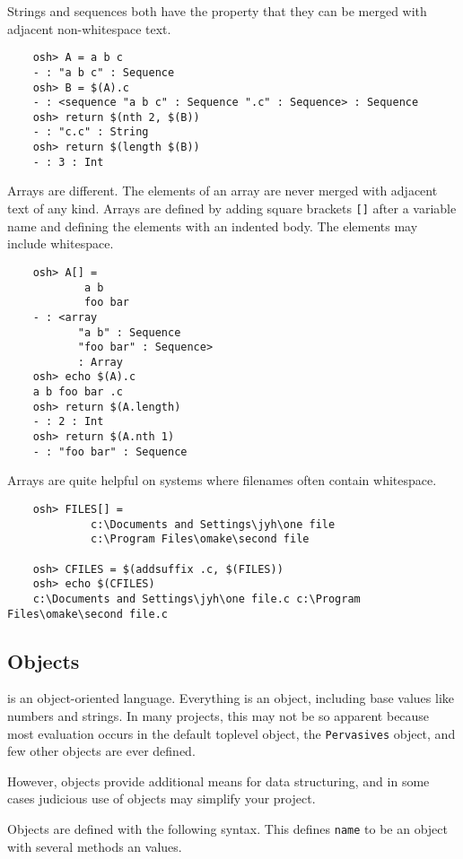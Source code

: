 Strings and sequences both have the property that they can be merged
with adjacent non-whitespace text.

\begin{verbatim}
    osh> A = a b c
    - : "a b c" : Sequence
    osh> B = $(A).c
    - : <sequence "a b c" : Sequence ".c" : Sequence> : Sequence
    osh> return $(nth 2, $(B))
    - : "c.c" : String
    osh> return $(length $(B))
    - : 3 : Int
\end{verbatim}

Arrays are different.  The elements of an array are never merged with
adjacent text of any kind.  Arrays are defined by adding square
brackets \verb+[]+ after a variable name and defining the elements
with an indented body.  The elements may include whitespace.

\begin{verbatim}
    osh> A[] =
            a b
            foo bar
    - : <array
           "a b" : Sequence
           "foo bar" : Sequence>
           : Array
    osh> echo $(A).c
    a b foo bar .c
    osh> return $(A.length)
    - : 2 : Int
    osh> return $(A.nth 1)
    - : "foo bar" : Sequence
\end{verbatim}

Arrays are quite helpful on systems where filenames often contain whitespace.

\begin{verbatim}
    osh> FILES[] =
             c:\Documents and Settings\jyh\one file
             c:\Program Files\omake\second file

    osh> CFILES = $(addsuffix .c, $(FILES))
    osh> echo $(CFILES)
    c:\Documents and Settings\jyh\one file.c c:\Program Files\omake\second file.c
\end{verbatim}

\subsection{Objects}

 is an object-oriented language.  Everything is an object, including
base values like numbers and strings.  In many projects, this may not be so apparent
because most evaluation occurs in the default toplevel object, the \verb+Pervasives+
object, and few other objects are ever defined.

However, objects provide additional means for data structuring, and in some cases
judicious use of objects may simplify your project.

Objects are defined with the following syntax.  This defines \verb+name+
to be an object with several methods an values.

